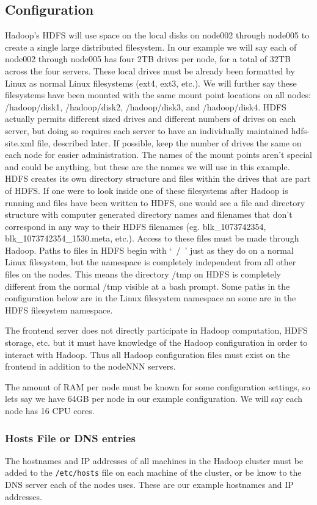 \subsection{Configuration}
Hadoop's HDFS will use space on the local disks on node002 through
node005 to create a single large distributed filesystem. In our example
we will say each of node002 through node005 has four 2TB drives per
node, for a total of 32TB across the four servers.  These local drives
must be already been formatted by Linux as normal Linux filesystems
(ext4, ext3, etc.).  We will further say these filesystems have been
mounted with the same mount point locations on all nodes: /hadoop/disk1,
/hadoop/disk2, /hadoop/disk3, and /hadoop/disk4.  HDFS actually permits
different sized drives and different numbers of drives on each server,
but doing so requires each server to have an individually maintained
hdfs-site.xml file, described later.  If possible, keep the number of
drives the same on each node for easier administration.  The names of
the mount points aren't special and could be anything, but these are
the names we will use in this example.  HDFS creates its own directory
structure and files within the drives that are part of HDFS.  If one
were to look inside one of these filesystems after Hadoop is running
and files have been written to HDFS, one would see a file and directory
structure with computer generated directory names and filenames that
don't correspond in any way to their HDFS filenames (eg. blk\_1073742354,
blk\_1073742354\_1530.meta, etc.).  Access to these files must be made
through Hadoop.  Paths to files in HDFS begin with `\!\ /\!\ ' just as
they do on a normal Linux filesystem, but the namespace is completely
independent from all other files on the nodes.  This means the directory
/tmp on HDFS is completely different from the normal /tmp visible at
a bash prompt.  Some paths in the configuration below are in the Linux
filesystem namespace an some are in the HDFS filesystem namespace.

The frontend server does not directly participate in Hadoop computation,
HDFS storage, etc. but it must have knowledge of the Hadoop configuration
in order to interact with Hadoop.  Thus all Hadoop configuration files
must exist on the frontend in addition to the nodeNNN servers.

The amount of RAM per node must be known for some configuration settings,
so lets say we have 64GB per node in our example configuration.  We will
say each node has 16 CPU cores.


\subsubsection{Hosts File or DNS entries}
The hostnames and IP addresses of all machines in the Hadoop cluster must
be added to the \verb|/etc/hosts| file on each machine of the cluster,
or be know to the DNS server each of the nodes uses.  These are our
example hostnames and IP addresses.

